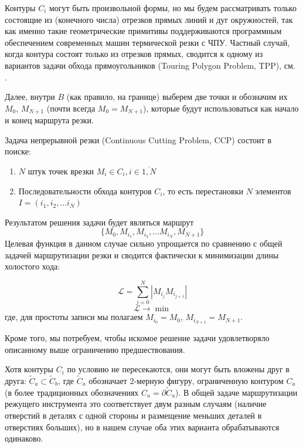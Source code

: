 \documentclass[14pt]{extarticle}
\theoremstyle{plain}%
\theoremstyle{remark}
\begin{document}
Контуры
$C_i$
могут быть произвольной формы,
но мы будем рассматривать только
состоящие из
(конечного числа)
отрезков прямых линий и дуг окружностей,
так как именно такие геометрические примитивы
поддерживаются программным обеспечением
современных машин термической резки с ЧПУ.
Частный случай,
когда контура состоят только
из отрезков прямых,
сводится к одному из вариантов
задачи обхода прямоугольников
(Touring Polygon Problem, TPP),
см.
\cite{bi13}.

Далее,
внутри
$B$
(как правило, на границе)
выберем две точки и обозначим их
$M_0$, $M_{N + 1}$
(почти всегда $M_0 = M_{N + 1}$),
которые будут использоваться
как начало и конец
маршрута резки.

Задача непрерывной резки
(Continuous Cutting Problem, CCP)
состоит в поиске:
\begin{enumerate}
\item
$N$ штук точек врезки $M_i \in C_i, i \in \overline{1, N}$
\item
Последовательности обхода контуров
$C_i$,
то есть перестановки
$N$
элементов
$I = (i_1, i_2, ... i_N)$
\end{enumerate}

Результатом решения задачи будет являться маршрут
\begin{equation}
  \{M_0, M_{i_1}, M_{i_2}, \dots M_{i_N}, M_{N + 1}\}
\end{equation}
Целевая функция в данном случае сильно упрощается
по сравнению с общей задачей маршрутизации резки
и сводится фактически к минимизации длины холостого хода:

\begin{equation}
  \mathcal{L} = \sum_{j=0}^N|M_{i_j}M_{i_{j+1}}|
  \label{air-move-length}
\end{equation}
$$
\mathcal{L} \to \min
$$
где, для простоты записи мы полагаем
$M_{i_0} = M_0$,
$M_{i_{N + 1}} = M_{N + 1}$.

Кроме того,
мы потребуем,
чтобы искомое решение задачи
удовлетворяло
описанному выше
ограничению предшествования.

Хотя контуры
$C_i$
по условию не пересекаются,
они могут быть вложены друг в друга:
\( \tilde C_a \subset \tilde C_b \),
где
$\tilde C_a$
обозначает 2-мерную фигуру,
ограниченную контуром
$C_a$
(в более традиционных обозначениях
$C_a = \partial \tilde C_a$).
В общей задаче маршрутизации
режущего инструмента это
соответствует двум разным случаям
(наличие отверстий в деталях с одной стороны
и размещение меньших деталей в отверстиях больших),
но в нашем случае оба этих
варианта обрабатываются одинаково.
\end{document}
